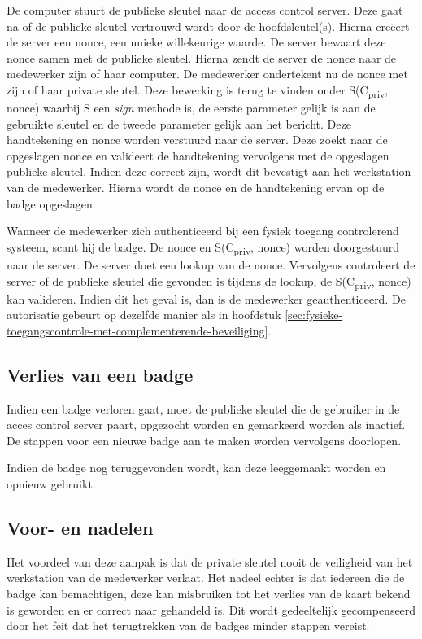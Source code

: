 De computer stuurt de publieke sleutel naar de access control server. Deze gaat
na of de publieke sleutel vertrouwd wordt door de hoofdsleutel(s). Hierna
creëert de server een nonce, een unieke willekeurige waarde. De server bewaart
deze nonce samen met de publieke sleutel. Hierna zendt de server de nonce naar
de medewerker zijn of haar computer. De medewerker ondertekent nu de nonce met
zijn of haar private sleutel. Deze bewerking is terug te vinden onder
S(C\textsubscript{priv}, nonce) waarbij S een \textit{sign} methode is, de
eerste parameter gelijk is aan de gebruikte sleutel en de tweede parameter
gelijk aan het bericht. Deze handtekening en nonce worden verstuurd naar de
server. Deze zoekt naar de opgeslagen nonce en valideert de handtekening
vervolgens met de opgeslagen publieke sleutel. Indien deze correct zijn, wordt
dit bevestigt aan het werkstation van de medewerker. Hierna wordt de nonce en de
handtekening ervan op de badge opgeslagen.

Wanneer de medewerker zich authenticeerd bij een fysiek toegang controlerend
systeem, scant hij de badge. De nonce en S(C\textsubscript{priv}, nonce) worden
doorgestuurd naar de server. De server doet een lookup van de nonce. Vervolgens
controleert de server of de publieke sleutel die gevonden is tijdens de lookup,
de S(C\textsubscript{priv}, nonce) kan valideren. Indien dit het geval is, dan
is de medewerker geauthenticeerd. De autorisatie gebeurt op dezelfde manier als
in hoofdstuk
\ref{sec:fysieke-toegangscontrole-met-complementerende-beveiliging}.

\subsection{Verlies van een badge}

Indien een badge verloren gaat, moet de publieke sleutel die de gebruiker in de
acces control server paart, opgezocht worden en gemarkeerd worden als inactief.
De stappen voor een nieuwe badge aan te maken worden vervolgens doorlopen.

Indien de badge nog teruggevonden wordt, kan deze leeggemaakt worden en opnieuw
gebruikt.

\subsection{Voor- en nadelen}
Het voordeel van deze aanpak is dat de private sleutel nooit de veiligheid van
het werkstation van de medewerker verlaat. Het nadeel echter is dat iedereen die
de badge kan bemachtigen, deze kan misbruiken tot het verlies van de kaart
bekend is geworden en er correct naar gehandeld is. Dit wordt gedeeltelijk
gecompenseerd door het feit dat het terugtrekken van de badges minder stappen
vereist.

